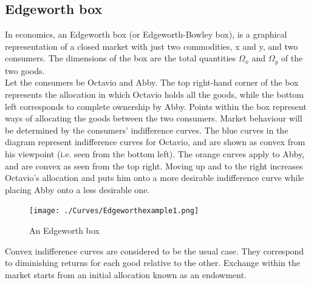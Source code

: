 \documentclass[a4paper, 12pt, reqno]{article}
\begin{document}
\subsection{Edgeworth box}
In economics, an Edgeworth box (or Edgeworth-Bowley box), is a graphical representation of a closed market with just two commodities, x and y, and two consumers. 
The dimensions of the box are the total quantities $\Omega_x$ and $\Omega_y$ of the two goods. \\
Let the consumers be Octavio and Abby. The top right-hand corner of the box represents the allocation in which Octavio holds all the goods, while the bottom left corresponds to complete ownership by Abby. 
Points within the box represent ways of allocating the goods between the two consumers.
Market behaviour will be determined by the consumers' indifference curves. The blue curves in the diagram represent indifference curves for Octavio, and are shown as convex from his viewpoint (i.e. seen from the bottom left). 
The orange curves apply to Abby, and are convex as seen from the top right. Moving up and to the right increases Octavio's allocation and puts 
him onto a more desirable indifference curve while placing Abby onto a less desirable one. 
\begin{figure}[H]
    \centering
    \texttt{[image: ./Curves/Edgeworthexample1.png]}
    \caption{An Edgeworth box}
    \label{fig: An Edgeworth box} 
\end{figure}  
Convex indifference curves are considered to be the usual case. 
They correspond to diminishing returns for each good relative to the other.
Exchange within the market starts from an initial allocation known as an endowment.
\end{document}
